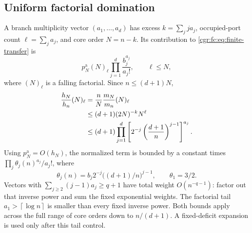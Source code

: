 \documentclass[11pt,letterpaper]{article}
\numberwithin{equation}{section}
\theoremstyle{definition}\newtheorem{definition}[theorem]{Definition}
\theoremstyle{remark}\newtheorem{remark}[theorem]{Remark}
\newcommand{\ceil}[1]{\left\lceil #1\right\rceil}
\begin{document}
\subsection{Uniform factorial domination}
A branch multiplicity vector $(a_1,\ldots,a_d)$ has excess
$k=\sum_j ja_j$, occupied-port count $\ell=\sum_ja_j$, and core
order $N=n-k$. Its contribution to \eqref{cgr:fc:eq:finite-transfer} is
\begin{equation}\label{cgr:fc:eq:branch-term}
 p_N^{\mathrm a}(N)_\ell\prod_{j=1}^d\frac{b_j^{a_j}}{a_j!},
 \qquad \ell\le N,
\end{equation}
where $(N)_\ell$ is a falling factorial. Since $n\le(d+1)N$,
\begin{align}
 \frac{h_N}{h_n}(N)_\ell
 &=\frac nN\frac{m_N}{m_n}(N)_\ell\notag\\
 &\le(d+1)(2N)^{-k}N^\ell\notag\\
 &\le(d+1)\prod_{j=1}^d
 \left[2^{-j}\left(\frac{d+1}{n}\right)^{j-1}\right]^{a_j}.
 \label{cgr:fc:eq:factorial-dom}
\end{align}
Using $p_N^{\mathrm a}=O(h_N)$, the normalized term is bounded by
a constant times $\prod_j\theta_j(n)^{a_j}/a_j!$, where
\begin{equation}\label{cgr:fc:eq:theta}
 \theta_j(n)=b_j2^{-j}\bigl((d+1)/n\bigr)^{j-1},
 \qquad \theta_1=3/2.
\end{equation}
Vectors with $\sum_{j\ge2}(j-1)a_j\ge q+1$ have total weight
$O(n^{-q-1})$: factor out that inverse power and sum the fixed
exponential weights. The factorial tail $a_1>\ceil{\log n}$
is smaller than every fixed inverse power. Both bounds apply
across the full range of core orders down to $n/(d+1)$.
A fixed-deficit expansion is used only after this tail control.
\end{document}
